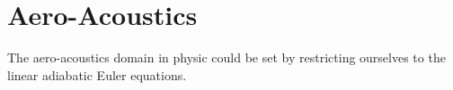  \chapter{Aero-Acoustics}
 The aero-acoustics domain in physic could be set by restricting ourselves to the linear adiabatic Euler equations.  



